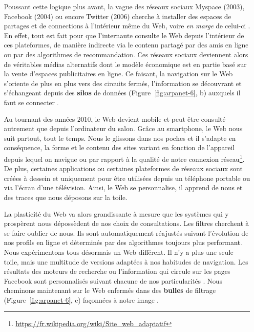 \documentclass[symmetric,justified,marginals=raggedouter]{tufte-book}
\begin{document}
\noindent Poussant cette logique plus avant, la vague des réseaux sociaux Myspace (2003), Facebook (2004) ou encore Twitter (2006) cherche à installer des espaces de partages et de connections à l'intérieur même du Web, voire \textit{en marge} de celui-ci \citep{ellison_social_2007}. En effet, tout est fait pour que l'internaute consulte le Web depuis l'intérieur de ces plateformes, de manière indirecte via le contenu partagé par des amis en ligne ou par des algorithmes de recommandation. Ces réseaux sociaux deviennent alors de véritables médias alternatifs dont le modèle économique est en partie basé sur la vente d'espaces publicitaires en ligne. Ce faisant, la navigation sur le Web s'oriente de plus en plus vers des circuits fermés, l'information se découvrant et s'échangeant depuis des \textbf{silos} de données (Figure~\ref{fig:arpanet-6}, b) auxquels il faut se connecter \citep{helmond_platformization_2015}. 

Au tournant des années 2010, le Web devient mobile et peut être consulté autrement que depuis l'ordinateur du salon. Grâce au smartphone, le Web nous suit partout, tout le temps. Nous le glissons dans nos poches et il s'adapte en conséquence, la forme et le contenu des sites variant en fonction de l'appareil depuis lequel on navigue ou par rapport à la qualité de notre connexion réseau\footnote{\RaggedOuter \url{https://fr.wikipedia.org/wiki/Site\_web\_adaptatif}}. De plus, certaines applications ou certaines plateformes de réseaux sociaux sont créées à dessein et uniquement pour être utilisées depuis un téléphone portable ou via l'écran d'une télévision. Ainsi, le Web se personnalise, il apprend de nous et des traces que nous déposons sur la toile. 

La plasticité du Web va alors grandissante à mesure que les systèmes qui y prospèrent nous dépossèdent de nos choix de consultations. Les filtres cherchent à se faire oublier de nous. Ils sont automatiquement réajustés suivant l'évolution de nos profils en ligne et déterminés par des algorithmes toujours plus performant. Nous expérimentons tous désormais un Web différent. Il n'y a plus une seule toile, mais une multitude de versions adaptées à nos habitudes de navigation. Les résultats des moteurs de recherche ou l'information qui circule sur les pages Facebook sont personnalisés suivant chacune de nos particularités \citep{robertson_auditing_2018}. Nous cheminons maintenant sur le Web enfermés dans des \textbf{bulles} de filtrage (Figure~\ref{fig:arpanet-6}, c) façonnées à notre image \citep{gillani_me_2018}.
\end{document}
